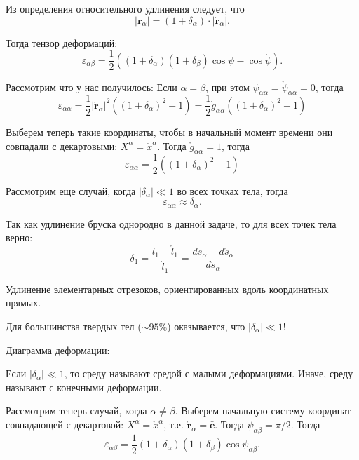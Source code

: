 Из определения относительного удлинения следует, что
\[
  |\mathbf{r}_\alpha| = (1 + \delta_\alpha) \cdot |\mathring{\mathbf{r}}_\alpha|.
\]

Тогда тензор деформаций:
\[
  \varepsilon_{\alpha\beta} = \dfrac{1}{2} \left( (1+\delta_\alpha) (1+\delta_\beta) \cos\psi - \cos\mathring{\psi} \right).
\]

Рассмотрим что у нас получилось:
Если $\alpha=\beta$, при этом $\psi_{\alpha\alpha} = \mathring{\psi}_{\alpha\alpha} = 0$, тогда 
\[
  \varepsilon_{\alpha\alpha}
  = \dfrac{1}{2} |\mathring{\mathbf{r}}_\alpha|^2 ((1+\delta_\alpha)^2 - 1)
  = \dfrac{1}{2} \mathring{g}_{\alpha\alpha} ((1+\delta_\alpha)^2 - 1)
\]

Выберем теперь такие координаты, чтобы в начальный момент времени они совпадали с декартовыми:
$X^\alpha = \mathring{x}^\alpha$.
Тогда $\mathring{g}_{\alpha\alpha} = 1$, тогда
\[
  \varepsilon_{\alpha\alpha}
  = \dfrac{1}{2} ((1+\delta_\alpha)^2 - 1)
\]

Рассмотрим еще случай, когда $|\delta_\alpha| \ll 1$ во всех точках тела, тогда
\[
  \varepsilon_{\alpha\alpha} \approx \delta_\alpha.
\]

\begin{example}

  Так как удлинение бруска однородно в данной задаче, то для всех точек тела верно:
  \[
    \delta_1 = \dfrac{l_1 - \mathring{l}_1}{\mathring{l}_1} = \dfrac{ds_\alpha - d\mathring{s}_\alpha}{d\mathring{s}_\alpha}
  \]

  Удлинение элементарных отрезоков, ориентированных вдоль координатных прямых.
\end{example}

Для большинства твердых тел ($\sim 95\%$) оказывается, что $|\delta_\alpha| \ll 1$!

Диаграмма деформации:


Если $|\delta_\alpha| \ll 1$, то среду называют средой с малыми деформациями.
Иначе, среду называют с конечными деформации.

Рассмотрим теперь случай, когда $\alpha\neq\beta$. Выберем начальную систему координат 
совпадающей с декартовой: $X^\alpha = \mathring{x}^\alpha$, т.е.
$\mathbf{\mathring{r}}_\alpha = \bar{\mathbf{e}}$. Тогда $\psi_{\alpha\beta} = \pi/2$.
Тогда
\[
  \varepsilon_{\alpha\beta} = \dfrac{1}{2} (1+\delta_\alpha)(1+\delta_\beta) \cos\psi_{\alpha\beta}.
\]

